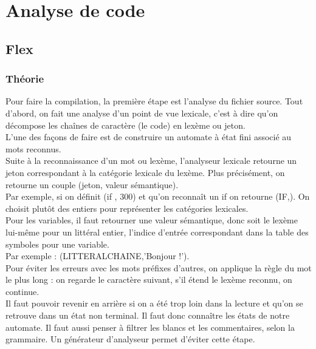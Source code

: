 \section{Analyse de code}

\subsection{Flex}
\subsubsection{Théorie}
Pour faire la compilation, la première étape est l'analyse du fichier source.
Tout d'abord, on fait une analyse d'un point de vue lexicale, c'est à dire qu'on décompose les chaînes de caractère (le code) en lexème ou jeton.\\
L'une des façons de faire est de construire un automate à état fini associé au mots reconnus.\\
 Suite à la reconnaissance d'un mot ou lexème, l'analyseur lexicale retourne un jeton correspondant  à la catégorie lexicale du lexème. Plus précisément, on retourne un couple (jeton, valeur sémantique).\\
Par exemple, si on définit  (if , 300) et qu'on reconnaît un if on retourne (IF,).
On choisit plutôt des entiers pour représenter les catégories lexicales.\\
Pour les variables, il faut retourner une valeur sémantique, donc soit le lexème lui-même pour un littéral entier, l'indice d'entrée correspondant dans la table des symboles pour une variable.\\
Par exemple : (LITTERALCHAINE,'Bonjour !').\\
Pour éviter les erreurs avec les mots préfixes d'autres, on applique la règle du mot le plus long : on regarde le caractère suivant, s'il étend le lexème reconnu, on continue.\\
Il faut pouvoir revenir en arrière si on a été trop loin dans la lecture et qu'on se retrouve dans un état non terminal. Il faut donc connaître les états de notre automate.
Il faut aussi penser à filtrer les blancs et les commentaires, selon la grammaire.
Un générateur d'analyseur permet d'éviter cette étape.\\

